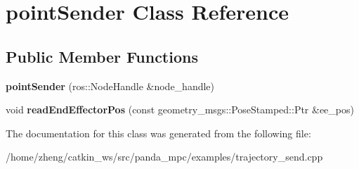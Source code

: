 \hypertarget{classpoint_sender}{}\section{point\+Sender Class Reference}
\label{classpoint_sender}
\subsection*{Public Member Functions}
\begin{DoxyCompactItemize}
\item 
\mbox{\label{classpoint_sender_aa392d6483fcdd166b8e03c08fdd6a418}} 
{\bfseries point\+Sender} (ros\+::\+Node\+Handle \&node\+\_\+handle)
\item 
\mbox{\label{classpoint_sender_af59b3d88321751fa981b72a1d51eb2f0}} 
void {\bfseries read\+End\+Effector\+Pos} (const geometry\+\_\+msgs\+::\+Pose\+Stamped\+::\+Ptr \&ee\+\_\+pos)
\end{DoxyCompactItemize}


The documentation for this class was generated from the following file\+:\begin{DoxyCompactItemize}
\item 
/home/zheng/catkin\+\_\+ws/src/panda\+\_\+mpc/examples/trajectory\+\_\+send.\+cpp\end{DoxyCompactItemize}
